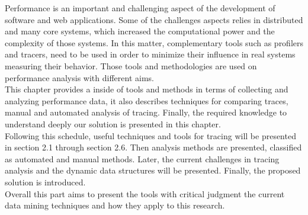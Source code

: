 \label{sec:RevLitt}
Performance is an important and challenging aspect of the development of software and web applications. Some of the challenges aspects relies in distributed and many core systems, which increased the computational power and the complexity of those systems. In this matter, complementary tools such as profilers and tracers, need to be used in order to minimize their influence in real systems measuring their behavior. Those tools and methodologies are used on performance analysis with different aims. \\
This chapter provides a inside of tools and methods in terms of collecting and analyzing performance data, it also describes techniques for comparing traces, manual and automated analysis of tracing. Finally, the required knowledge to understand deeply our solution is presented in this chapter.\\
Following this schedule, useful techniques and tools for tracing will be presented in section 2.1 through section 2.6. Then analysis methods are presented, classified as automated and manual methods. Later, the current challenges in tracing analysis and the dynamic data structures will be presented. Finally, the proposed solution is introduced.\\
Overall this part aims to present the tools with critical judgment the current data mining techniques and how they apply to this research.

